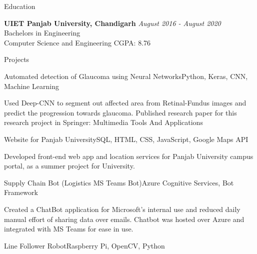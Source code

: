 \documentclass{resume} %
\begin{document}

    \begin{rSection}{Education}

        {\bf UIET Panjab University, Chandigarh} \hfill {\em August 2016 - August 2020} 
        \\ Bachelors in Engineering
        \\ Computer Science and Engineering \hfill{CGPA: 8.76}
        
    \end{rSection}




    \begin{rSection}{Projects}

        \begin{pSubsection}{Automated detection of Glaucoma using Neural Networks}{Python, Keras, CNN, Machine Learning}{}{}
        
            \item Used Deep-CNN to segment out affected area from Retinal-Fundus images and predict the progression towards glaucoma. Published research paper for this research project in Springer: Multimedia Tools And Applications
            
        \end{pSubsection}
        

        \begin{pSubsection}{Website for Panjab University}{SQL, HTML, CSS, JavaScript, Google Maps API}{}{}
        
            \item Developed front-end web app and location services for Panjab University campus portal, as a summer project for University.
        \end{pSubsection}


        \begin{pSubsection}{Supply Chain Bot (Logistics MS Teams Bot)}{Azure Cognitive Services, Bot Framework}{}{}
        
            \item Created a ChatBot application for Microsoft’s internal use and reduced daily manual effort of sharing data over emails. Chatbot was hosted over Azure and integrated with MS Teams for ease in use.
        \end{pSubsection}
        
        
        \begin{pSubsection}{Line Follower Robot}{Raspberry Pi, OpenCV, Python}{}{}
        

\end{pSubsection}
\end{rSection}
\end{document}
